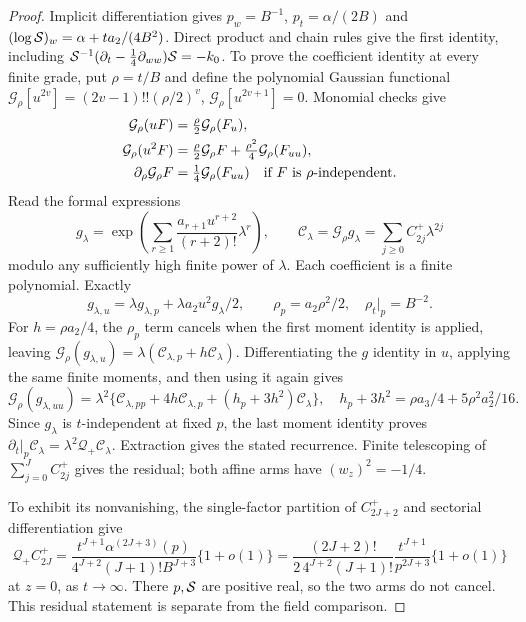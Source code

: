 \begin{proof}
Implicit differentiation gives $p_w=B^{-1}$,
$p_t=\alpha/(2B)$ and
$(\log\mathcal S)_w=\alpha+ta_2/(4B^2)$. Direct product and chain
rules give the first identity, including $\mathcal S^{-1}
(\partial_t-\tfrac14\partial_{ww})\mathcal S=-k_0$.
To prove the coefficient identity at every finite grade, put
$\rho=t/B$ and define the polynomial Gaussian functional
$\mathcal G_\rho[u^{2v}]=(2v-1)!!(\rho/2)^v$,
$\mathcal G_\rho[u^{2v+1}]=0$. Monomial checks give
\begin{align}
 \mathcal G_\rho(uF)&=\tfrac\rho2\mathcal G_\rho(F_u),\notag\\
 \mathcal G_\rho(u^2F)&=\tfrac\rho2\mathcal G_\rho F
                       +\tfrac{\rho^2}4\mathcal G_\rho(F_{uu}),\notag\\
 \partial_\rho\mathcal G_\rho F&=\tfrac14\mathcal G_\rho(F_{uu})
 \quad\hbox{if $F$ is $\rho$-independent}.
 \label{eq:positive-gaussian-functional}
\end{align}
Read the formal expressions
\[
 g_\lambda=\exp\!\left(\sum_{r\ge1}
             \frac{a_{r+1}u^{r+2}}{(r+2)!}\lambda^r\right),
 \qquad \mathcal C_\lambda=\mathcal G_\rho g_\lambda
                =\sum_{j\ge0}C_{2j}^+\lambda^{2j}
\]
modulo any sufficiently high finite power of $\lambda$. Each
coefficient is a finite polynomial. Exactly
\[
 g_{\lambda,u}=\lambda g_{\lambda,p}
           +\lambda a_2u^2g_\lambda/2,\qquad
 \rho_p=a_2\rho^2/2,\quad \rho_t|_p=B^{-2}.
\]
For $h=\rho a_2/4$, the $\rho_p$ term cancels when the first
moment identity is applied, leaving
$\mathcal G_\rho(g_{\lambda,u})
 =\lambda(\mathcal C_{\lambda,p}+h\mathcal C_\lambda)$.
Differentiating the $g$ identity in $u$, applying the same finite
moments, and then using it again gives
\[
 \mathcal G_\rho(g_{\lambda,uu})
 =\lambda^2\{\mathcal C_{\lambda,pp}+4h\mathcal C_{\lambda,p}
                         +(h_p+3h^2)\mathcal C_\lambda\},
 \quad h_p+3h^2=\rho a_3/4+5\rho^2a_2^2/16.
\]
Since $g_\lambda$ is $t$-independent at fixed $p$, the last
moment identity proves
$\partial_t|_p\mathcal C_\lambda=\lambda^2\mathcal Q_+
\mathcal C_\lambda$. Extraction gives the stated recurrence.
Finite telescoping of $\sum_{j=0}^JC_{2j}^+$ gives the residual;
both affine arms have $(w_z)^2=-1/4$.

To exhibit its nonvanishing, the single-factor partition of
$C_{2J+2}^+$ and sectorial differentiation give
\[
 \mathcal Q_+C_{2J}^+
 =\frac{t^{J+1}\alpha^{(2J+3)}(p)}
        {4^{J+2}(J+1)!B^{J+3}}\{1+o(1)\}
 =\frac{(2J+2)!}{2\,4^{J+2}(J+1)!}
       \frac{t^{J+1}}{p^{2J+3}}\{1+o(1)\}
\]
at $z=0$, as $t\to\infty$. There $p,\mathcal S$ are positive real,
so the two arms do not cancel. This residual statement is separate
from the field comparison.
\end{proof}


